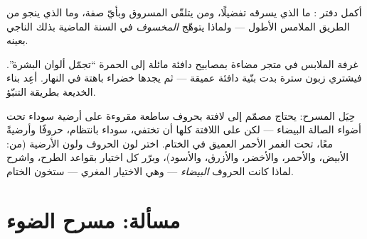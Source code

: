 \begin{exercise}[$\star\star$]\label{exo:g8:colors-spectra:10}
أكمل دفتر : ما الذي يسرقه  تفضيلًا، ومن يتلقّى
المسروق وبأيّ صفة، وما الذي ينجو من الطريق الملامس الأطول ---
ولماذا يتوهّج \emph{ المخسوف} في السنة الماضية بذلك
الناجي بعينه.
\end{exercise}

\begin{exercise}[$\star\star$]\label{exo:g8:colors-spectra:11}
غرفة  الملابس في متجر مضاءة بمصابيح دافئة مائلة إلى الحمرة
``تجمّل ألوان البشرة''. فيشتري زبون سترة بدت بنّية دافئة عميقة
--- ثم يجدها خضراء باهتة في  النهار. أعِد بناء الخديعة
بطريقة التنبّؤ.
\end{exercise}

\begin{exercise}[$\star\star\star$]\label{exo:g8:colors-spectra:12}
حِيَل المسرح: يحتاج مصمّم إلى لافتة بحروف ساطعة مقروءة على
أرضية سوداء تحت أضواء الصالة البيضاء --- لكن على اللافتة كلها
أن تختفي، سوداء بانتظام، حروفًا وأرضيةً معًا، تحت الغمر الأحمر
العميق في الختام. اختر لون الحروف ولون الأرضية (من: الأبيض،
والأحمر، والأخضر، والأزرق، والأسود)، وبرّر كل اختيار بقواعد
الطرح، واشرح لماذا كانت الحروف \emph{البيضاء} --- وهي
الاختيار المغري --- ستخون الختام.
\end{exercise}

\section{مسألة: مسرح الضوء}

